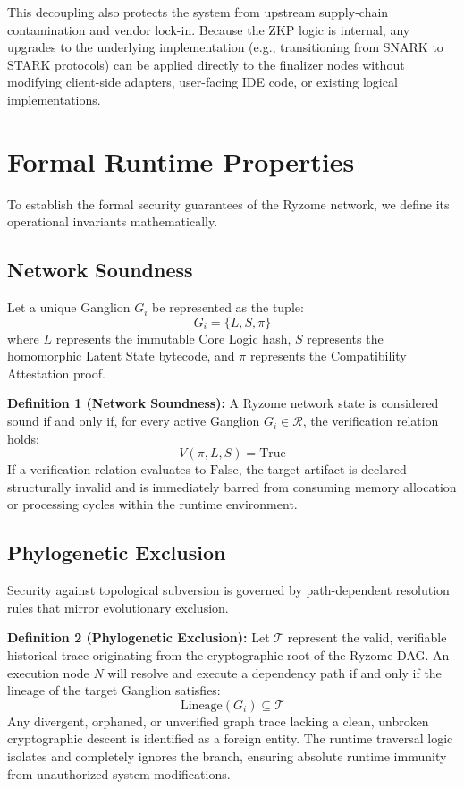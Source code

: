 \documentclass{article}
\begin{document}
This decoupling also protects the system from upstream supply-chain contamination and vendor lock-in. Because the ZKP logic is internal, any upgrades to the underlying implementation (e.g., transitioning from SNARK to STARK protocols) can be applied directly to the finalizer nodes without modifying client-side adapters, user-facing IDE code, or existing logical implementations.

\section{Formal Runtime Properties}
To establish the formal security guarantees of the Ryzome network, we define its operational invariants mathematically.

\subsection{Network Soundness}
Let a unique Ganglion $G_i$ be represented as the tuple:
$$G_i = \{L, S, \pi\}$$
where $L$ represents the immutable Core Logic hash, $S$ represents the homomorphic Latent State bytecode, and $\pi$ represents the Compatibility Attestation proof.

\textbf{Definition 1 (Network Soundness):} A Ryzome network state is considered sound if and only if, for every active Ganglion $G_i \in \mathcal{R}$, the verification relation holds:
$$V(\pi, L, S) = \text{True}$$
If a verification relation evaluates to $\text{False}$, the target artifact is declared structurally invalid and is immediately barred from consuming memory allocation or processing cycles within the runtime environment.

\subsection{Phylogenetic Exclusion}
Security against topological subversion is governed by path-dependent resolution rules that mirror evolutionary exclusion.

\textbf{Definition 2 (Phylogenetic Exclusion):} Let $\mathcal{T}$ represent the valid, verifiable historical trace originating from the cryptographic root of the Ryzome DAG. An execution node $N$ will resolve and execute a dependency path if and only if the lineage of the target Ganglion satisfies:
$$\text{Lineage}(G_i) \subseteq \mathcal{T}$$
Any divergent, orphaned, or unverified graph trace lacking a clean, unbroken cryptographic descent is identified as a foreign entity. The runtime traversal logic isolates and completely ignores the branch, ensuring absolute runtime immunity from unauthorized system modifications.
\end{document}
